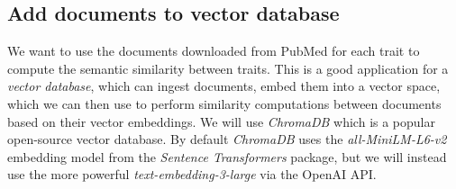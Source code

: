 \subsection{Add documents to vector database}

We want to use the documents downloaded from PubMed for each trait to compute the semantic similarity between traits.  This is a good application for a \textit{vector database}, which can ingest documents, embed them into a vector space, which we can then use to perform similarity computations between documents based on their vector embeddings.  We will use \textit{ChromaDB} which is a popular open-source vector database.  By default \textit{ChromaDB} uses the \textit{all-MiniLM-L6-v2} embedding model from the \textit{Sentence Transformers} package, but we will instead use the more powerful \textit{text-embedding-3-large} via the OpenAI API.

